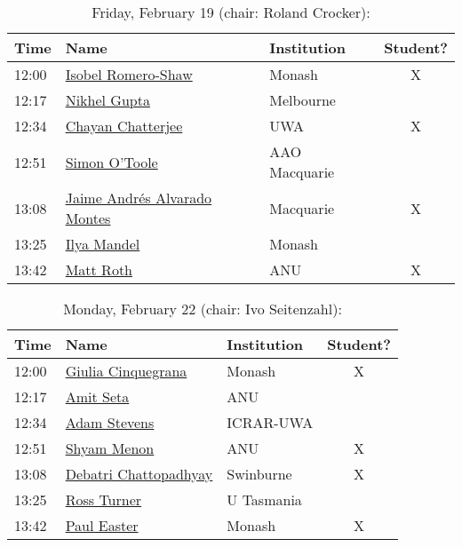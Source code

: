 \documentclass[amsmath,onecolumn]{revtex4-1}
\begin{document}
\begin{table}[!htbp]
	\centering
	\caption{Friday, February 19 (chair: Roland Crocker):}
\begin{tabular}{| l | l | l | c |}
	\hline
	Time & Name  & Institution & Student? \\ 		
	\hline
	12:00 & \href{https://forms.gle/QwJvBjKeWbRrQ97m7}{Isobel Romero-Shaw} & Monash & X\\
	12:17 & \href{https://forms.gle/XAmwmEd3dRt7QEjb7}{Nikhel Gupta}  & Melbourne & \\
	12:34 & \href{https://forms.gle/gmpXZ9kMXJKox8GM7}{Chayan Chatterjee} & UWA  & X \\
	12:51 & \href{https://forms.gle/XEyQTWZNqPMGETbu5}{Simon O'Toole} & AAO Macquarie  & \\
	13:08 & \href{https://forms.gle/AEjYKdsjeKiSzeRR6}{Jaime Andr\'{e}s Alvarado Montes} &  Macquarie & X\\
	13:25 & \href{https://forms.gle/sdeWUK3dkFgqULr87}{Ilya Mandel} & Monash & \\
	13:42 & \href{https://forms.gle/6LQ6DTo8L1x8NXCF9}{Matt Roth} & ANU & X\\
	\hline
\end{tabular}
\end{table}

\begin{table}[!htbp]
	\centering
	\caption{Monday, February 22 (chair: Ivo Seitenzahl):}
\begin{tabular}{| l | l | l | c |}
	\hline
	Time & Name  & Institution & Student? \\ 		
	\hline
	12:00 & \href{https://forms.gle/f9aCvkqne7aecucD9}{Giulia Cinquegrana} & Monash & X\\
	12:17 & \href{https://forms.gle/Wjw1cJZn9xUzqcCFA}{Amit  Seta} & ANU  & \\
	12:34 & \href{https://forms.gle/6wci26zWoRPaeJva8}{Adam Stevens} & ICRAR-UWA &\\
	12:51 & \href{https://forms.gle/KsdoiTeJMeXJyHkA7}{Shyam Menon} & ANU & X\\
	13:08 & \href{https://forms.gle/dqsmc8Uo1pCRUZeJ9}{Debatri  Chattopadhyay} & Swinburne  & X \\
	13:25 & \href{https://forms.gle/T76zARjzaGhWZ8rt6}{Ross Turner}  & U Tasmania  & \\
	13:42 & \href{https://forms.gle/uUsdxjCsV8GEo3XZ6}{Paul Easter} & Monash & X\\
	\hline
\end{tabular}
\end{table}
\end{document}
